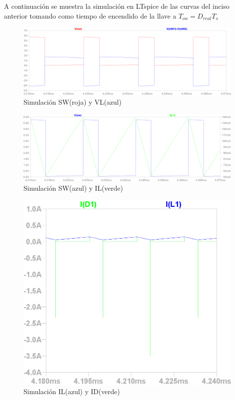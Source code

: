 \documentclass[e4_tp1_main.tex]{subfiles}
\begin{document}
A continuaci\'on se muestra la simulaci\'on en LTspice de las curvas del inciso anterior tomando como tiempo de encendido de la llave a $T_{on}=D_{real}T_s$


\begin{figure}[H]
  \centering
    \includegraphics[scale = 0.6]{Imagenes/punto2/SW&VL}
  \caption{Simulaci\'on SW(roja) y VL(azul)}
  \label{fig:SW&VL}
\end{figure}

\begin{figure}[H]
  \centering
    \includegraphics[scale = 0.6]{Imagenes/punto2/SW&IL}
  \caption{Simulaci\'on SW(azul) y IL(verde)}
  \label{fig:SW&IL}
\end{figure}


\begin{figure}[H]
  \centering
    \includegraphics[scale=1]{Imagenes/punto2/PicodeIrr}
  \caption{Simulaci\'on IL(azul) y ID(verde)}
  \label{fig:IL&ID}
\end{figure}
\end{document}
